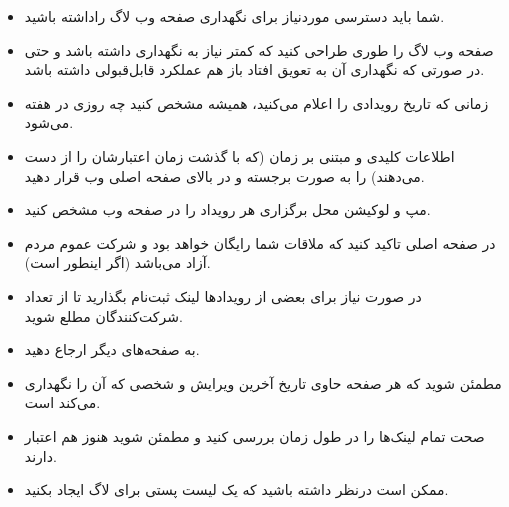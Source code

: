 \begin{itemize}
\item
شما باید دسترسی موردنیاز برای نگهداری صفحه وب لاگ راداشته باشید.
\item
صفحه وب لاگ را طوری طراحی کنید که کمتر نیاز به نگهداری داشته باشد و حتی در صورتی که
نگهداری آن به تعویق افتاد باز هم عملکرد قابل‌قبولی داشته باشد.
\item
زمانی که تاریخ رویدادی را اعلام می‌کنید، همیشه مشخص کنید چه روزی در هفته می‌شود.
\item
اطلاعات کلیدی و مبتنی بر زمان (که با گذشت زمان اعتبارشان را از دست می‌دهند)
را به صورت برجسته و در بالای صفحه اصلی وب قرار دهید.
\item
مپ و لوکیشن محل برگزاری هر رویداد را در صفحه وب مشخص کنید.
\item
در صفحه اصلی تاکید کنید که ملاقات شما رایگان خواهد بود و شرکت عموم مردم آزاد می‌باشد
(اگر اینطور است).
\item
در صورت نیاز برای بعضی از رویدادها لینک ثبت‌نام بگذارید تا از تعداد شرکت‌کنندگان مطلع شوید.
\item
به صفحه‌های دیگر ارجاع دهید.
\item
مطمئن شوید که هر صفحه حاوی تاریخ آخرین ویرایش و شخصی که آن را نگهداری می‌کند است.
\item
صحت تمام لینک‌ها را در طول زمان بررسی کنید و مطمئن شوید هنوز هم اعتبار دارند.
\item
ممکن است درنظر داشته باشید که یک لیست پستی برای لاگ ایجاد بکنید.

\end{itemize}
